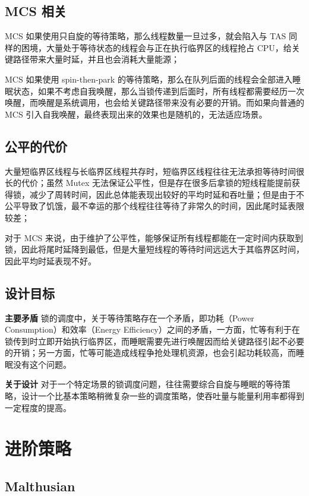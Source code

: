 \documentclass[UTF8]{ctexart}
\begin{document}
\subsection{MCS 相关}

MCS 如果使用只自旋的等待策略，那么线程数量一旦过多，就会陷入与 TAS 同样的困境，大量处于等待状态的线程会与正在执行临界区的线程抢占 CPU，给关键路径带来大量时延，并且也会消耗大量能源；

MCS 如果使用 spin-then-park 的等待策略，那么在队列后面的线程会全部进入睡眠状态，如果不考虑自我唤醒，那么当锁传递到后面时，所有线程都需要经历一次唤醒，而唤醒是系统调用，也会给关键路径带来没有必要的开销。而如果向普通的 MCS 引入自我唤醒，最终表现出来的效果也是随机的，无法适应场景。

\subsection{公平的代价}

大量短临界区线程与长临界区线程共存时，短临界区线程往往无法承担等待时间很长的代价；虽然 Mutex 无法保证公平性，但是存在很多后拿锁的短线程能提前获得锁，减少了周转时间，因此总体能表现出较好的平均时延和吞吐量；但是由于不公平导致了饥饿，最不幸运的那个线程往往等待了非常久的时间，因此尾时延表限较差；

对于 MCS 来说，由于维护了公平性，能够保证所有线程都能在一定时间内获取到锁，因此将尾时延降到最低，但是大量短线程的等待时间远远大于其临界区时间，因此平均时延表现不好。

\subsection{设计目标}

\textbf{主要矛盾} 锁的调度中，关于等待策略存在一个矛盾，即功耗（Power Consumption）和效率（Energy Efficiency）之间的矛盾，一方面，忙等有利于在锁传到时立即开始执行临界区，而睡眠需要先进行唤醒因而给关键路径引起不必要的开销；另一方面，忙等可能造成线程争抢处理机资源，也会引起功耗较高，而睡眠没有这个问题。

\textbf{关于设计} 对于一个特定场景的锁调度问题，往往需要综合自旋与睡眠的等待策略，设计一个比基本策略稍微复杂一些的调度策略，使吞吐量与能量利用率都得到一定程度的提高。


\section{进阶策略}

\subsection{Malthusian}
\end{document}
